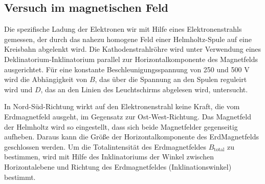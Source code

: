 \subsection{Versuch im magnetischen Feld}

Die spezifische Ladung der Elektronen wir mit Hilfe eines Elektronenstrahls gemessen, der durch das nahezu homogene Feld einer Helmholtz-Spule auf eine Kreisbahn abgelenkt wird.
Die Kathodenstrahlröhre wird unter Verwendung eines Deklinatorium-Inklinatorium parallel zur Horizontalkomponente des Magnetfelds ausgerichtet.
Für eine konstante Beschleunigungsspannung von 250 und 500 V wird die Abhängigkeit von $B$, das über die Spannung an den Spulen reguleirt wird und $D$, das an den Linien des Leuchtschirms abgelesen wird, untersucht.

In Nord-Süd-Richtung wirkt auf den Elektronenstrahl keine Kraft, die vom Erdmagnetfeld ausgeht, im Gegensatz zur Ost-West-Richtung.
Das Magnetfeld der Helmholtz wird so eingestellt, dass sich beide Magnetfelder gegenseitig aufheben.
Daraus kann die Größe der Horizontalkomponente des ErdMagnetfelds geschlossen werden.
Um die Totalintensität des Erdmagnetfeldes $B_\text{total}$ zu bestimmen, wird mit Hilfe des Inklinatoriums der Winkel zwischen Horizontalebene und Richtung des Erdmagnetfeldes (Inklinationswinkel) bestimmt.
